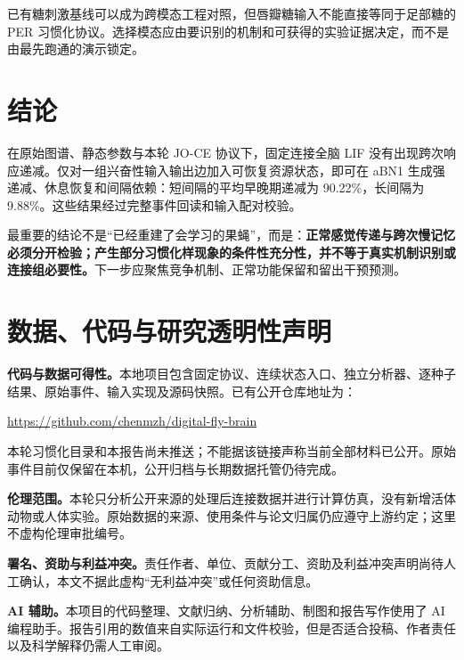 已有糖刺激基线可以成为跨模态工程对照，但唇瓣糖输入不能直接等同于足部糖的 PER 习惯化协议\citep{trisal2022}。选择模态应由要识别的机制和可获得的实验证据决定，而不是由最先跑通的演示锁定。

\section{结论}
在原始图谱、静态参数与本轮 JO-CE 协议下，固定连接全脑 LIF 没有出现跨次响应递减。仅对一组兴奋性输入输出边加入可恢复资源状态，即可在 aBN1 生成强递减、休息恢复和间隔依赖：短间隔的平均早晚期递减为 90.22\%，长间隔为 9.88\%。这些结果经过完整事件回读和输入配对校验。

最重要的结论不是“已经重建了会学习的果蝇”，而是：\textbf{正常感觉传递与跨次慢记忆必须分开检验；产生部分习惯化样现象的条件性充分性，并不等于真实机制识别或连接组必要性。}下一步应聚焦竞争机制、正常功能保留和留出干预预测。

\section*{数据、代码与研究透明性声明}
\textbf{代码与数据可得性。}本地项目包含固定协议、连续状态入口、独立分析器、逐种子结果、原始事件、输入实现及源码快照。已有公开仓库地址为：
\begin{center}\small\url{https://github.com/chenmzh/digital-fly-brain}\end{center}
本轮习惯化目录和本报告尚未推送；不能据该链接声称当前全部材料已公开。原始事件目前仅保留在本机，公开归档与长期数据托管仍待完成。

\textbf{伦理范围。}本轮只分析公开来源的处理后连接数据并进行计算仿真，没有新增活体动物或人体实验。原始数据的来源、使用条件与论文归属仍应遵守上游约定；这里不虚构伦理审批编号。

\textbf{署名、资助与利益冲突。}责任作者、单位、贡献分工、资助及利益冲突声明尚待人工确认，本文不据此虚构“无利益冲突”或任何资助信息。

\textbf{AI 辅助。}本项目的代码整理、文献归纳、分析辅助、制图和报告写作使用了 AI 编程助手。报告引用的数值来自实际运行和文件校验，但是否适合投稿、作者责任以及科学解释仍需人工审阅。
